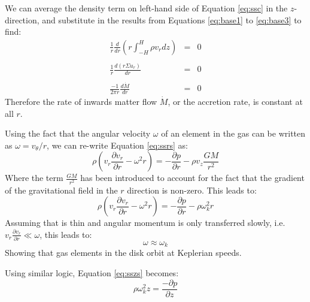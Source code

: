 We can average the density term on left-hand side of Equation \ref{eq:ssc} in the $z$-direction, and substitute in the results from Equations \ref{eq:base1} to \ref{eq:base3} to find:
\begin{eqnarray}
\frac{1}{r}\frac{d}{dr}\left(r\int_{-H}^H\rho v_rdz\right)&=&0\\\nonumber\\
\frac{1}{r}\frac{d(r\Sigma u_r)}{dr}&=&0\\\nonumber\\
\frac{-1}{2\pi r}\frac{d\dot{M}}{dr}&=&0
\end{eqnarray}
Therefore the rate of inwards matter flow $\dot{M}$, or the accretion rate, is constant at all $r$.
\par Using the fact that the angular velocity $\omega$ of an element in the gas can be written as $\omega=v_\theta/r$, we can re-write Equation \ref{eq:ssrs} as:
\begin{equation}
\rho\left(v_r\frac{\partial v_r}{\partial r}-\omega^2r\right)=-\frac{\partial p}{\partial r}-\rho v_z\frac{GM}{r^2}
\end{equation}
Where the term $\frac{GM}{r^2}$ has been introduced to account for the fact that the gradient of the gravitational field in the $r$ direction is non-zero.  This leads to:
\begin{equation}
\rho\left(v_r\frac{\partial v_r}{\partial r}-\omega^2r\right)=-\frac{\partial p}{\partial r}-\rho\omega_k^2r
\end{equation}
Assuming that is thin and angular momentum is only transferred slowly, i.e. $v_r\frac{\partial v_r}{\partial r}\ll\omega$, this leads to:
\begin{equation}
\omega\approx\omega_k
\end{equation}
Showing that gas elements in the disk orbit at Keplerian speeds.
\par Using similar logic, Equation \ref{eq:sszs} becomes:
\begin{equation}
\rho\omega_k^2 z=\frac{-\partial p}{\partial z}\label{eq:idgas}
\end{equation}
